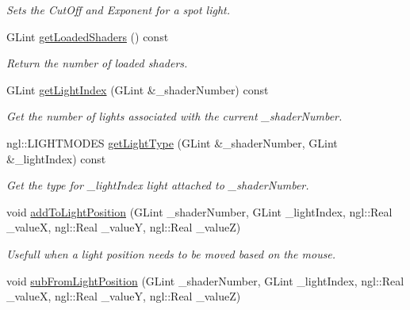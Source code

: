\begin{DoxyCompactItemize}
\begin{DoxyCompactList}\small\item\em Sets the Cut\-Off and Exponent for a spot light. \end{DoxyCompactList}\item 
\hypertarget{class_deferred_shading_a50f6c59f76ccaca318a793a3e54c18ec}{G\-Lint \hyperlink{class_deferred_shading_a50f6c59f76ccaca318a793a3e54c18ec}{get\-Loaded\-Shaders} () const }\label{class_deferred_shading_a50f6c59f76ccaca318a793a3e54c18ec}

\begin{DoxyCompactList}\small\item\em Return the number of loaded shaders. \end{DoxyCompactList}\item 
\hypertarget{class_deferred_shading_aef3ff57cb1c4c91954ca31b286cdd5f4}{G\-Lint \hyperlink{class_deferred_shading_aef3ff57cb1c4c91954ca31b286cdd5f4}{get\-Light\-Index} (G\-Lint \&\-\_\-shader\-Number) const }\label{class_deferred_shading_aef3ff57cb1c4c91954ca31b286cdd5f4}

\begin{DoxyCompactList}\small\item\em Get the number of lights associated with the current \-\_\-shader\-Number. \end{DoxyCompactList}\item 
\hypertarget{class_deferred_shading_a2b9065454be7772005234dece83b7767}{ngl\-::\-L\-I\-G\-H\-T\-M\-O\-D\-E\-S \hyperlink{class_deferred_shading_a2b9065454be7772005234dece83b7767}{get\-Light\-Type} (G\-Lint \&\-\_\-shader\-Number, G\-Lint \&\-\_\-light\-Index) const }\label{class_deferred_shading_a2b9065454be7772005234dece83b7767}

\begin{DoxyCompactList}\small\item\em Get the type for \-\_\-light\-Index light attached to \-\_\-shader\-Number. \end{DoxyCompactList}\item 
\hypertarget{class_deferred_shading_ae7f140a7a77f9f91536826a70b78f782}{void \hyperlink{class_deferred_shading_ae7f140a7a77f9f91536826a70b78f782}{add\-To\-Light\-Position} (G\-Lint \-\_\-shader\-Number, G\-Lint \-\_\-light\-Index, ngl\-::\-Real \-\_\-value\-X, ngl\-::\-Real \-\_\-value\-Y, ngl\-::\-Real \-\_\-value\-Z)}\label{class_deferred_shading_ae7f140a7a77f9f91536826a70b78f782}

\begin{DoxyCompactList}\small\item\em Usefull when a light position needs to be moved based on the mouse. \end{DoxyCompactList}\item 
\hypertarget{class_deferred_shading_acbd0eeaf6a47ff0e1a09e137871dd2a5}{void \hyperlink{class_deferred_shading_acbd0eeaf6a47ff0e1a09e137871dd2a5}{sub\-From\-Light\-Position} (G\-Lint \-\_\-shader\-Number, G\-Lint \-\_\-light\-Index, ngl\-::\-Real \-\_\-value\-X, ngl\-::\-Real \-\_\-value\-Y, ngl\-::\-Real \-\_\-value\-Z)}\label{class_deferred_shading_acbd0eeaf6a47ff0e1a09e137871dd2a5}


\end{DoxyCompactItemize}
